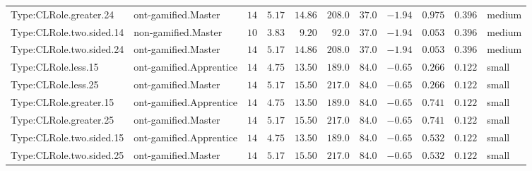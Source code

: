 \documentclass[6pt,a4paper]{article}
\begin{document}
{\begin{longtable}{llrrrrrrrrl}
Type:CLRole.greater.24&ont-gamified.Master&$14$&$5.17$&$14.86$&$208.0$&$ 37.0$&$-1.94$&$0.975$&$0.396$&medium\tabularnewline
Type:CLRole.two.sided.14&non-gamified.Master&$10$&$3.83$&$ 9.20$&$ 92.0$&$ 37.0$&$-1.94$&$0.053$&$0.396$&medium\tabularnewline
Type:CLRole.two.sided.24&ont-gamified.Master&$14$&$5.17$&$14.86$&$208.0$&$ 37.0$&$-1.94$&$0.053$&$0.396$&medium\tabularnewline
Type:CLRole.less.15&ont-gamified.Apprentice&$14$&$4.75$&$13.50$&$189.0$&$ 84.0$&$-0.65$&$0.266$&$0.122$&small\tabularnewline
Type:CLRole.less.25&ont-gamified.Master&$14$&$5.17$&$15.50$&$217.0$&$ 84.0$&$-0.65$&$0.266$&$0.122$&small\tabularnewline
Type:CLRole.greater.15&ont-gamified.Apprentice&$14$&$4.75$&$13.50$&$189.0$&$ 84.0$&$-0.65$&$0.741$&$0.122$&small\tabularnewline
Type:CLRole.greater.25&ont-gamified.Master&$14$&$5.17$&$15.50$&$217.0$&$ 84.0$&$-0.65$&$0.741$&$0.122$&small\tabularnewline
\newpage
Type:CLRole.two.sided.15&ont-gamified.Apprentice&$14$&$4.75$&$13.50$&$189.0$&$ 84.0$&$-0.65$&$0.532$&$0.122$&small\tabularnewline
Type:CLRole.two.sided.25&ont-gamified.Master&$14$&$5.17$&$15.50$&$217.0$&$ 84.0$&$-0.65$&$0.532$&$0.122$&small\tabularnewline
\hline
\end{longtable}}
\end{document}
